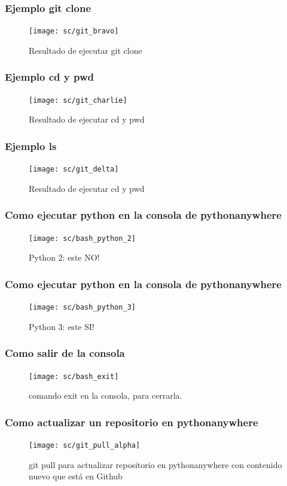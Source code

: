 \documentclass[11pt]{beamer}
\begin{document}
\begin{frame}
	\frametitle{Ejemplo git clone}
	\begin{figure}
		\centering
		\texttt{[image: sc/git\_bravo]}
		\caption{Resultado de ejecutar git clone}
	\end{figure}
	
\end{frame}

\begin{frame}
	\frametitle{Ejemplo cd y pwd}
	\begin{figure}
		\centering
		\texttt{[image: sc/git\_charlie]}
		\caption{Resultado de ejecutar cd y pwd}
	\end{figure}
	
\end{frame}

\begin{frame}
	\frametitle{Ejemplo ls}
	\begin{figure}
		\centering
		\texttt{[image: sc/git\_delta]}
		\caption{Resultado de ejecutar cd y pwd}
	\end{figure}
	
\end{frame}

\begin{frame}
	\frametitle{Como ejecutar python en la consola de pythonanywhere}
	\begin{figure}
		\centering
		\texttt{[image: sc/bash\_python\_2]}
		\caption{Python 2: este NO!}
	\end{figure}
	
\end{frame}

\begin{frame}
	\frametitle{Como ejecutar python en la consola de pythonanywhere}
	\begin{figure}
		\centering
		\texttt{[image: sc/bash\_python\_3]}
		\caption{Python 3: este SI!}
	\end{figure}
	
\end{frame}

\begin{frame}
	\frametitle{Como salir de la consola}
	\begin{figure}
		\centering
		\texttt{[image: sc/bash\_exit]}
		\caption{comando exit en la consola, para cerrarla.}
	\end{figure}
	
\end{frame}

\begin{frame}
	\frametitle{Como actualizar un repositorio en pythonanywhere}
\begin{figure}
	\centering
	\texttt{[image: sc/git\_pull\_alpha]}
	\caption{git pull para actualizar repositorio en pythonanywhere con contenido nuevo que está en Github}
	\label{fig:gitpullalpha}
\end{figure}

	
\end{frame}
\end{document}
